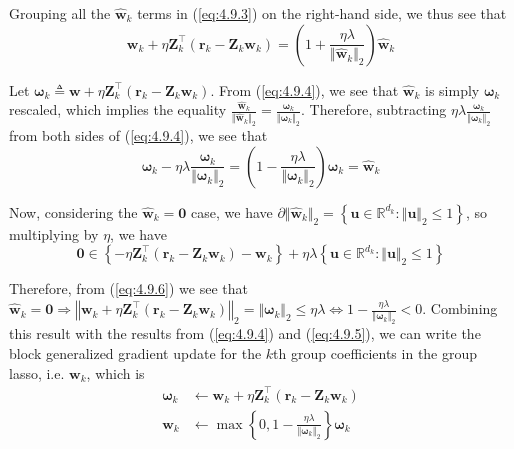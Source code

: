 \documentclass{article}
\numberwithin{equation}{section}
\begin{document}
Grouping all the $ \hat{\mathbf{w}}_k $ terms in (\ref{eq:4.9.3}) on the
right-hand side, we thus see that
\begin{equation} \label{eq:4.9.4}
    \mathbf{w}_k + \eta\mathbf{Z}_k^\top(\mathbf{r}_k -
    \mathbf{Z}_k\mathbf{w}_k) =
    \left(
        1 + \frac{\eta\lambda}{\Vert\hat{\mathbf{w}}_k\Vert_2}
    \right)
    \hat{\mathbf{w}}_k
\end{equation}

Let $ \boldsymbol{\omega}_k \triangleq \mathbf{w} +
\eta\mathbf{Z}_k^\top(\mathbf{r}_k - \mathbf{Z}_k\mathbf{w}_k) $. From
(\ref{eq:4.9.4}), we see that $ \hat{\mathbf{w}}_k $ is simply
$ \boldsymbol{\omega}_k $ rescaled, which implies the equality
$ \frac{\hat{\mathbf{w}}_k}{\Vert\hat{\mathbf{w}}_k\Vert_2} =
\frac{\boldsymbol{\omega}_k}{\Vert\boldsymbol{\omega}_k\Vert_2} $.
Therefore, subtracting
$ \eta\lambda\frac{\boldsymbol{\omega}_k}{\Vert\boldsymbol{\omega}_k\Vert_2} $
from both sides of (\ref{eq:4.9.4}), we see that
\begin{equation} \label{eq:4.9.5}
    \boldsymbol{\omega}_k -
    \eta\lambda
    \frac{\boldsymbol{\omega}_k}{\Vert\boldsymbol{\omega}_k\Vert_2} =
    \left(
        1 - \frac{\eta\lambda}{\Vert\boldsymbol{\omega}_k\Vert_2}
    \right)
    \boldsymbol{\omega}_k =
    \hat{\mathbf{w}}_k
\end{equation}

Now, considering the $ \hat{\mathbf{w}}_k = \mathbf{0} $ case, we have
$ \partial\Vert\hat{\mathbf{w}}_k\Vert_2 = \left\{\mathbf{u} \in
\mathbb{R}^{d_k} : \Vert\mathbf{u}\Vert_2 \le 1\right\} $, so multiplying by
$ \eta $, we have
\begin{equation} \label{eq:4.9.6}
    \mathbf{0} \in
    \left\{
        -\eta\mathbf{Z}_k^\top(\mathbf{r}_k - \mathbf{Z}_k\mathbf{w}_k) -
        \mathbf{w}_k
    \right\} +
    \eta\lambda
    \left\{
        \mathbf{u} \in \mathbb{R}^{d_k} : \Vert\mathbf{u}\Vert_2 \le 1
    \right\}
\end{equation}

Therefore, from (\ref{eq:4.9.6}) we see that
$ \hat{\mathbf{w}}_k = \mathbf{0} \Rightarrow \left\Vert\mathbf{w}_k +
\eta\mathbf{Z}_k^\top(\mathbf{r}_k - \mathbf{Z}_k\mathbf{w}_k)\right\Vert_2 =
\Vert\boldsymbol{\omega}_k\Vert_2 \le \eta\lambda \Leftrightarrow
1 - \frac{\eta\lambda}{\Vert\boldsymbol{\omega}_k\Vert_2} < 0 $. Combining
this result with the results from (\ref{eq:4.9.4}) and (\ref{eq:4.9.5}), we
can write the block generalized gradient update for the $ k $th group
coefficients in the group lasso, i.e. $ \mathbf{w}_k $, which is
\begin{equation} \label{eq:group_lasso_gen_block_update}
    \begin{split}
        \boldsymbol{\omega}_k &
        \leftarrow
        \mathbf{w}_k + \eta\mathbf{Z}_k^\top(\mathbf{r}_k -
        \mathbf{Z}_k\mathbf{w}_k) \\
        \mathbf{w}_k &
        \leftarrow
        \max\left\{
            0,
            1 - \frac{\eta\lambda}{\Vert\boldsymbol{\omega}_k\Vert_2}
        \right\}
        \boldsymbol{\omega}_k
    \end{split}
\end{equation}
\end{document}
